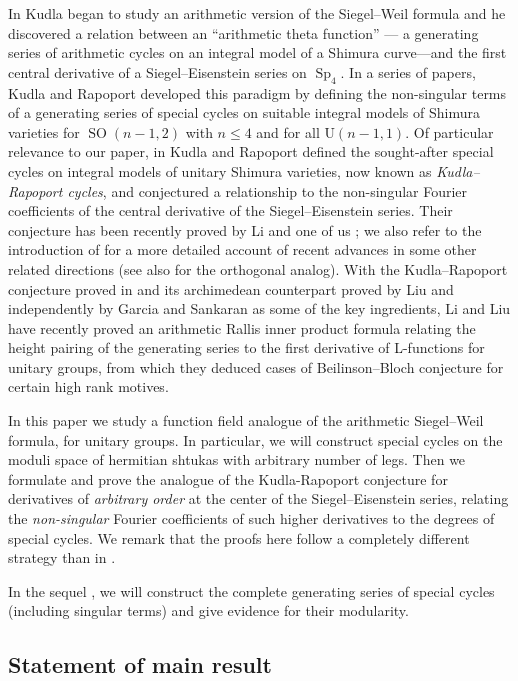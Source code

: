 \documentclass[reqno]{amsart}
\numberwithin{equation}{section}
\newcommand{\U}{\mathrm{U}}
\DeclareMathOperator{\Sp}{Sp}
\DeclareMathOperator{\SO}{SO}
\theoremstyle{remark}
\numberwithin{equation}{section}
\begin{document}
In \cite{Kudla1997} Kudla began to study an arithmetic version of the Siegel--Weil formula and he discovered a relation between an ``arithmetic theta function'' --- a generating series of arithmetic cycles on an integral model of a Shimura curve---and the  first central derivative of a Siegel--Eisenstein series on $\Sp_4$. In a series of papers, Kudla and Rapoport developed this paradigm by defining the non-singular terms of a generating series of special cycles on suitable integral models of Shimura varieties for $\SO(n-1,2)$ with $n\leq 4$ and for all $\U(n-1,1)$. Of particular relevance to our paper, in \cite{KRI, KRII} Kudla and Rapoport defined the sought-after special cycles on integral models of unitary Shimura varieties, now known as \emph{Kudla--Rapoport cycles}, and conjectured a relationship to the non-singular Fourier coefficients  of the central derivative of the Siegel--Eisenstein series.  Their conjecture has been recently proved by Li and one of us \cite{LZ1}; we also refer to the introduction of \cite{LZ1} for a more detailed account of recent advances in some other related directions (see also \cite{LZ2} for the orthogonal analog). With the Kudla--Rapoport  conjecture proved in \cite{LZ1} and its archimedean counterpart proved by Liu \cite{Liu11}  and independently by Garcia and Sankaran \cite{GS19} as some of the key ingredients, Li and Liu \cite{LL1,LL2} have recently proved an arithmetic Rallis inner product formula relating the height pairing of the generating series to the first derivative of L-functions for unitary groups, from which they deduced cases of Beilinson--Bloch conjecture for certain high rank motives.

In this paper we study a function field analogue of the arithmetic Siegel--Weil formula, for unitary groups. 
In particular, we will construct special cycles on the moduli space of hermitian shtukas with arbitrary number of legs. Then we formulate and prove the analogue of the Kudla-Rapoport conjecture for derivatives of {\em arbitrary order} at the center of the Siegel--Eisenstein series, relating the {\em non-singular} Fourier coefficients of such higher derivatives to the degrees of special cycles. We remark that the proofs here follow a completely different strategy than in \cite{LZ1}.

In the sequel \cite{FYZ2}, we will construct the complete generating series of special cycles (including singular terms) and give evidence for their modularity.

\subsection{Statement of main result}
\end{document}
